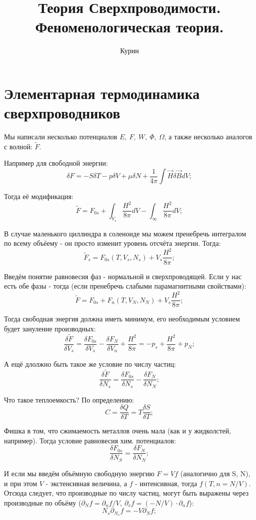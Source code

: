 \documentclass[a4paper, 14pt, russian]{article}
\title{Теория Сверхпроводимости. Феноменологическая теория.}
\author{Курин}
\date{}
\newcommand{\be}{\begin{equation}}
\newcommand{\ee}{\end{equation}}
\newcommand{\pa}{\partial}
\begin{document}
	\maketitle

	\section{Элементарная термодинамика сверхпроводников}

	Мы написали несколько потенциалов $E,~F,~W,~\Phi,~\Omega$,
	а также несколько аналогов с волной: $\tilde F$.

	Например для свободной энергии:
	\be
		\delta F = - S\delta T - p \delta V + \mu \delta N + \frac{1}{4\pi} \int \vec H  \delta \vec B dV;
	\ee
	
	Тогда её модификация:
	\be
		\tilde F = F_{0s} + \int_{V_s} \frac{H^2}{8\pi} dV - \int_\infty \frac{H^2}{8\pi} dV;
	\ee

	В случае маленького циллиндра в соленоиде мы можем пренебречь интегралом по всему объёему - 
	он просто изменит уровень отсчёта энергии. Тогда:
	\be
		\tilde{F}_s = F_{0s} (T,V_s,N_s) + V_s \frac{H^2}{8\pi};
	\ee

	Введём понятие равновесия фаз - нормальной и сверхпроводящей. Если у нас 
	есть обе фазы - тогда (если пренебречь слабыми парамагнитными свойствами):
	\be
		\tilde F = F_{0s} + F_n(T, V_N, N_N) + V_s \frac{H^2}{8\pi};
	\ee

	Тогда свободная энергия должна иметь минимум, его необходимым условием будет 
	зануление производных:
	\be
		\frac{\delta \tilde F}{\delta V_s} = \frac{\delta F_{0s}}{\delta V_s} -
			\frac{\delta F_N}{\delta V_n} + \frac{H^2}{8\pi} = -p_s + 
				\frac{H^2}{8\pi} + p_N;
	\ee

	А ещё длолжно быть такое же условие по числу частиц:
	\be
		\frac{\delta \tilde F}{\delta N_s} = \frac{\delta F_{0s}}{\delta N_s} -
			\frac{\delta F_{N}}{\delta N_N}; 
	\ee

	Что такое теплоемкость? По определению:
	\be
		C = \frac{\delta Q}{\delta T} = T \frac{\delta S}{\delta T};
	\ee

	Фишка в том, что сжимаемость металлов очень мала (как и у жидколстей, например).
	Тогда условие равновесия хим. потенциалов:
	\be
		\frac{\delta F_{0s}}{\delta N_S} = \frac{\delta F_{N}}{\delta N_N};
	\ee

	И если мы введём объёмную свободную энергию $F = V f$ (аналогично для S, N),
	и при этом $V$ - экстенсивная величина, а $f$ - интенсивная, тогда $f(T, n = N / V)$.
	Отсюда следует, что производные по числу частиц,  могут быть выражены через 
	производные по объёму ($\pa_N f = \pa_n f / V,~ \pa_v f = (-N/ V) \cdot \pa_n f$):
	\be
		N_s \pa_{N_s} f = - V \pa_N f;
	\ee
\end{document}
